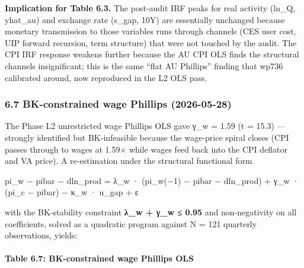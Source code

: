 \documentclass[
]{article}
\begin{document}
\textbf{Implication for Table 6.3.} The post-audit IRF peaks for real
activity (ln\_Q, yhat\_au) and exchange rate (s\_gap, 10Y) are
essentially unchanged because monetary transmission to those variables
runs through channels (CES user cost, UIP forward recursion, term
structure) that were not touched by the audit. The CPI IRF response
weakens further because the AU CPI OLS finds the structural channels
insignificant; this is the same ``flat AU Phillips'' finding that wp736
calibrated around, now reproduced in the L2 OLS pass.

\subsubsection{6.7 BK-constrained wage Phillips
(2026-05-28)}\label{bk-constrained-wage-phillips-2026-05-28}

The Phase L2 unrestricted wage Phillips OLS gave γ\_w = 1.59 (t = 15.3)
--- strongly identified but BK-infeasible because the wage-price spiral
closes (CPI passes through to wages at 1.59× while wages feed back into
the CPI deflator and VA price). A re-estimation under the structural
functional form

pi\_w − pibar − dln\_prod = λ\_w · (pi\_w(−1) − pibar − dln\_prod) +
γ\_w · (pi\_c − pibar) − κ\_w · u\_gap + ε

with the BK-stability constraint \textbf{λ\_w + γ\_w ≤ 0.95} and
non-negativity on all coefficients, solved as a quadratic program
against N = 121 quarterly observations, yields:

\paragraph{Table 6.7: BK-constrained wage Phillips
OLS}\label{table-6.7-bk-constrained-wage-phillips-ols}
\end{document}
